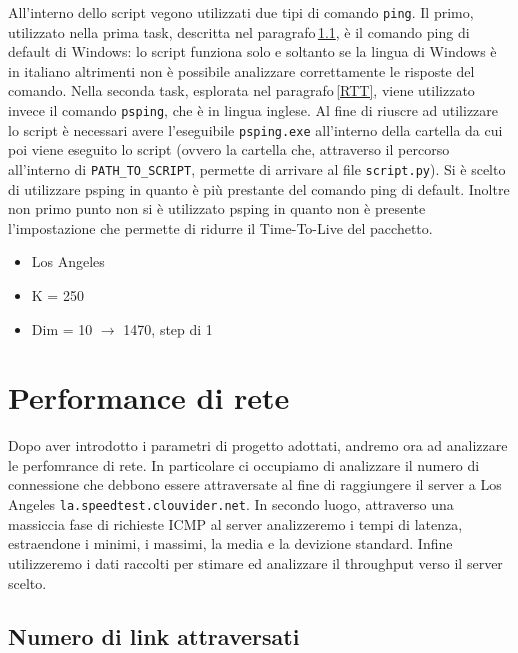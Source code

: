 All'interno dello script vegono utilizzati due tipi di comando \texttt{ping}. Il primo, utilizzato nella prima task, descritta nel paragrafo\,\ref{links}, è il comando ping di default di Windows: lo script funziona solo e soltanto se la lingua di Windows è in italiano altrimenti non è possibile analizzare correttamente le risposte del comando. Nella seconda task, esplorata nel paragrafo\,\ref{RTT}, viene utilizzato invece il comando \texttt{psping}, che è in lingua inglese. Al fine di riuscre ad utilizzare lo script è necessari avere l'eseguibile \texttt{psping.exe} all'interno della cartella da cui poi viene eseguito lo script (ovvero la cartella che, attraverso il percorso all'interno di \texttt{PATH\_TO\_SCRIPT}, permette di arrivare al file \texttt{script.py}). Si è scelto di utilizzare psping in quanto è più prestante del comando ping di default. Inoltre non primo punto non si è utilizzato psping in quanto non è presente l'impostazione che permette di ridurre il Time-To-Live del pacchetto.


\begin{itemize}
    \item Los Angeles
    \item K = 250
    \item Dim = 10 $\to$ 1470, step di 1
\end{itemize}


\vspace{35px}\section{Performance di rete}\label{performance}

Dopo aver introdotto i parametri di progetto adottati, andremo ora ad analizzare le perfomrance di rete. In particolare ci occupiamo di analizzare il numero di connessione che debbono essere attraversate al fine di raggiungere il server a Los Angeles \texttt{la.speedtest.clouvider.net}. In secondo luogo, attraverso una massiccia fase di richieste ICMP al server analizzeremo i tempi di latenza, estraendone i minimi, i massimi, la media e la devizione standard. Infine utilizzeremo i dati raccolti per stimare ed analizzare il throughput verso il server scelto.

\vspace{15px}\subsection{Numero di link attraversati}\label{links}

